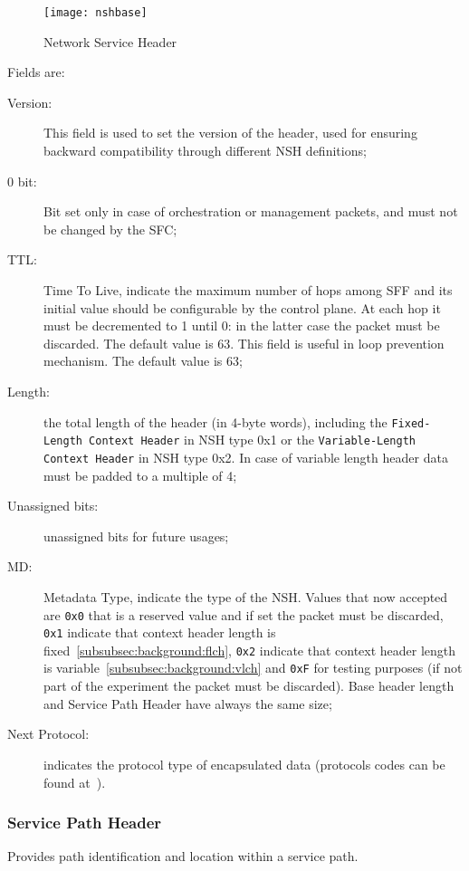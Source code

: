 \begin{figure}[H]
  \centering
  \texttt{[image: nshbase]}
  \caption[Network Service Header]{Network Service Header~\cite{rfc8300}}
  \label{chap:background:img:nshformat}
\end{figure}

Fields are:
\begin{description}
  \item[Version:] This field is used to set the version of the header, used for
  ensuring backward compatibility through different NSH definitions;
  \item[0 bit:] Bit set only in case of orchestration or management packets, and
  must not be changed by the SFC;
  \item[TTL:] Time To Live, indicate the maximum number of hops among SFF and
  its initial value should be configurable by the control plane. At each hop it
  must be decremented to 1 until 0: in the latter case the packet must be
  discarded. The default value is 63. This field is useful in loop prevention
  mechanism. The default value is 63;
  \item[Length:] the total length of the header (in 4-byte words), including
  the \texttt{Fixed-Length Context Header} in NSH type 0x1 or the
  \texttt{Variable-Length Context Header} in NSH type 0x2. In case of variable
  length header data must be padded to a multiple of 4;
  \item[Unassigned bits:] unassigned bits for future usages;
  \item[MD:] Metadata Type, indicate the type of the NSH. Values that now
  accepted are \texttt{0x0} that is a reserved value and if set the packet must
  be discarded, \texttt{0x1} indicate that context header length is
  fixed~\ref{subsubsec:background:flch}, \texttt{0x2} indicate that context
  header length is variable~\ref{subsubsec:background:vlch} and \texttt{0xF} for
  testing purposes (if not part of the experiment the packet must be discarded).
  Base header length and Service Path Header have always the same size;
  \item[Next Protocol:] indicates the protocol type of encapsulated data
  (protocols codes can be found at~\cite{rfc8300}).
\end{description}

\subsubsection{Service Path Header}
Provides path identification and location within a service path.

